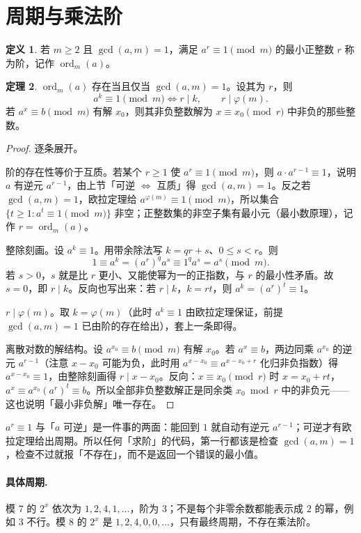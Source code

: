 \documentclass[UTF8,a4paper,11pt,oneside,openany,fontset=fandol]{ctexbook}
\theoremstyle{definition}
\newtheorem{definition}{定义}[chapter]
\newtheorem{theorem}[definition]{定理}
\newcommand{\ord}{\operatorname{ord}}
\begin{document}
\section{周期与乘法阶}
\begin{definition}
若 $m\ge2$ 且 $\gcd(a,m)=1$，满足 $a^r\equiv1\pmod m$ 的最小正整数 $r$ 称为阶，记作 $\ord_m(a)$。
\end{definition}
\begin{theorem}
$\ord_m(a)$ 存在当且仅当 $\gcd(a,m)=1$。设其为 $r$，则
\[
 a^k\equiv1\pmod m\iff r\mid k,\qquad r\mid\varphi(m).
\]
若 $a^x\equiv b\pmod m$ 有解 $x_0$，则其非负整数解为 $x\equiv x_0\pmod r$ 中非负的那些整数。
\end{theorem}
\begin{proof}
逐条展开。

阶的存在性等价于互质。若某个 $r\ge1$ 使 $a^r\equiv1\pmod m$，则 $a\cdot a^{r-1}\equiv1$，说明 $a$ 有逆元 $a^{r-1}$，由上节「可逆 $\iff$ 互质」得 $\gcd(a,m)=1$。反之若 $\gcd(a,m)=1$，欧拉定理给 $a^{\varphi(m)}\equiv1\pmod m$，所以集合 $\{t\ge1:a^t\equiv1\pmod m\}$ 非空；正整数集的非空子集有最小元（最小数原理），记作 $r=\ord_m(a)$。

整除刻画。设 $a^k\equiv1$。用带余除法写 $k=qr+s$、$0\le s<r$。则
\[
 1\equiv a^k=(a^r)^qa^s\equiv1^q a^s=a^s\pmod m.
\]
若 $s>0$，$s$ 就是比 $r$ 更小、又能使幂为一的正指数，与 $r$ 的最小性矛盾。故 $s=0$，即 $r\mid k$。反向也写出来：若 $r\mid k$，$k=rt$，则 $a^k=(a^r)^t\equiv1$。

$r\mid\varphi(m)$。取 $k=\varphi(m)$（此时 $a^k\equiv1$ 由欧拉定理保证，前提 $\gcd(a,m)=1$ 已由阶的存在给出），套上一条即得。

离散对数的解结构。设 $a^{x_0}\equiv b\pmod m$ 有解 $x_0$。若 $a^x\equiv b$，两边同乘 $a^{x_0}$ 的逆元 $a^{r-1}$（注意 $x-x_0$ 可能为负，此时用 $a^{x-x_0}\equiv a^{x-x_0+r}$ 化归非负指数）得 $a^{x-x_0}\equiv1$，由整除刻画得 $r\mid x-x_0$。反向：$x\equiv x_0\pmod r$ 时 $x=x_0+rt$，$a^x\equiv a^{x_0}(a^r)^t\equiv b$。所以全部非负整数解正是同余类 $x_0\bmod r$ 中的非负元——这也说明「最小非负解」唯一存在。
\end{proof}

\begin{tip}
$a^r\equiv1$ 与「$a$ 可逆」是一件事的两面：能回到 $1$ 就自动有逆元 $a^{r-1}$；可逆才有欧拉定理给出周期。所以任何「求阶」的代码，第一行都该是检查 $\gcd(a,m)=1$，检查不过就报「不存在」，而不是返回一个错误的最小值。
\end{tip}


\paragraph{具体周期.} 模 $7$ 的 $2^x$ 依次为 $1,2,4,1,\ldots$，阶为 $3$；不是每个非零余数都能表示成 $2$ 的幂，例如 $3$ 不行。模 $8$ 的 $2^x$ 是 $1,2,4,0,0,\ldots$，只有最终周期，不存在乘法阶。
\end{document}
